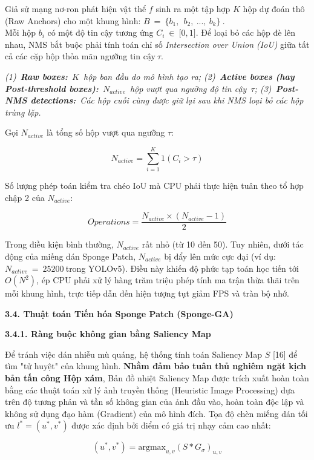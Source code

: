 Giả sử mạng nơ-ron phát hiện vật thể \(f\) sinh ra một tập hợp \(K\) hộp
dự đoán thô (Raw Anchors) cho một khung hình:
\(B\  = \ \{ b_{1},\ \ b_{2},\ ...,\ b_{k}\}\ .\)\\
Mỗi hộp \(b_{i}\) có một độ tin cậy tương ứng
\(C_{i}\  \in \ \lbrack 0,1\rbrack\). Để loại bỏ các hộp đè lên nhau,
NMS bắt buộc phải tính toán chỉ số \emph{Intersection over Union (IoU)}
giữa tất cả các cặp hộp thỏa mãn ngưỡng tin cậy\(\ \tau\).

\emph{(1)~\textbf{Raw boxes:}~}\(K\)\emph{~hộp ban đầu do mô hình tạo
ra; (2)~\textbf{Active boxes (hay Post-threshold
boxes):}~}\(N_{active}\)\emph{~hộp vượt qua ngưỡng độ tin
cậy~}\(\tau\)\emph{; (3)~\textbf{Post-NMS detections:}~Các hộp cuối cùng
được giữ lại sau khi NMS loại bỏ các hộp trùng lặp.}

Gọi \(N_{active}\) là tổng số hộp vượt qua ngưỡng \(\tau\):

\[N_{active} = \sum_{i = 1}^{K}1\left( C_{i} > \tau \right)\]

Số lượng phép toán kiểm tra chéo IoU mà CPU phải thực hiện tuân theo tổ
hợp chập 2 của \(N_{active}\):

\[Operations = \frac{N_{active} \times \left( N_{active} - 1 \right)}{2}\]

Trong điều kiện bình thường, \(N_{active}\) rất nhỏ (từ 10 đến 50). Tuy
nhiên, dưới tác động của miếng dán Sponge Patch, \(N_{active}\) bị đẩy
lên mức cực đại (ví dụ: \(N_{active}\  = \ 25200\ \)trong YOLOv5). Điều
này khiến độ phức tạp toán học tiến tới \(O(N^{2})\), ép CPU phải xử lý
hàng trăm triệu phép tính ma trận thừa thãi trên mỗi khung hình, trực
tiếp dẫn đến hiện tượng tụt giảm FPS và tràn bộ nhớ.

\textbf{3.4. Thuật toán Tiến hóa Sponge Patch (Sponge-GA)}

\textbf{3.4.1. Ràng buộc không gian bằng Saliency Map}

Để tránh việc dán nhiễu mù quáng, hệ thống tính toán Saliency Map \(S\)
{[}16{]} để tìm "tử huyệt" của khung hình. \textbf{Nhằm đảm bảo tuân thủ
nghiêm ngặt kịch bản tấn công Hộp xám}, Bản đồ nhiệt Saliency Map được
trích xuất hoàn toàn bằng các thuật toán xử lý ảnh truyền thống
(Heuristic Image Processing) dựa trên độ tương phản và tần số không gian
của ảnh đầu vào, hoàn toàn độc lập và không sử dụng đạo hàm (Gradient)
của mô hình đích. Tọa độ chèn miếng dán tối ưu
\(l^{*} = \left( u^{*},v^{*} \right)\) được xác định bởi điểm có giá trị
nhạy cảm cao nhất:

\[\left( u^{*},v^{*} \right) = \text{argmax}_{u,v}\left( S*G_{\sigma} \right)_{u,v}\]

